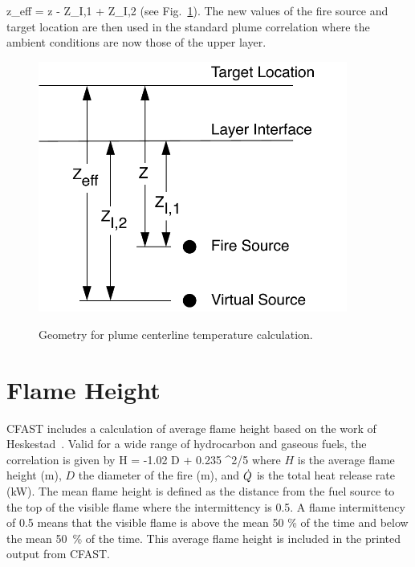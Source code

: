 \be z_{eff} = z - Z_{I,1} + Z_{I,2} \ee
(see Fig.~\ref{fig:Plume_Temp_Notation}). The new values of the fire source and  target location are then used in the standard plume correlation where the ambient conditions are now those of the upper layer.
\begin{figure}
\begin{center}
\includegraphics[width=4.0in]{FIGURES/Theory/Plume_Temp_Notation}\\
\end{center}
\caption{Geometry for plume centerline temperature calculation.}
 \label{fig:Plume_Temp_Notation}
\end{figure}

\section{Flame Height}
\label{sec:firemassbalance}


CFAST includes a calculation of average flame height based on the work of Heskestad~\cite{Heskestad:2002}. Valid for a wide range of hydrocarbon and gaseous fuels, the correlation is given by
\be
   H = -1.02 D + 0.235 ^{2/5}
\ee
where $H$ is the average flame height (m), $D$ the diameter of the fire (m), and $\dot{Q}$ is the total heat release rate (kW). The mean flame height is defined as the distance from the fuel source to the top of the visible flame where the intermittency is 0.5.  A flame intermittency of 0.5 means that the visible flame is above the mean 50 \% of the time and below the mean 50~\% of the time.  This average flame height is  included in the printed output from CFAST.







